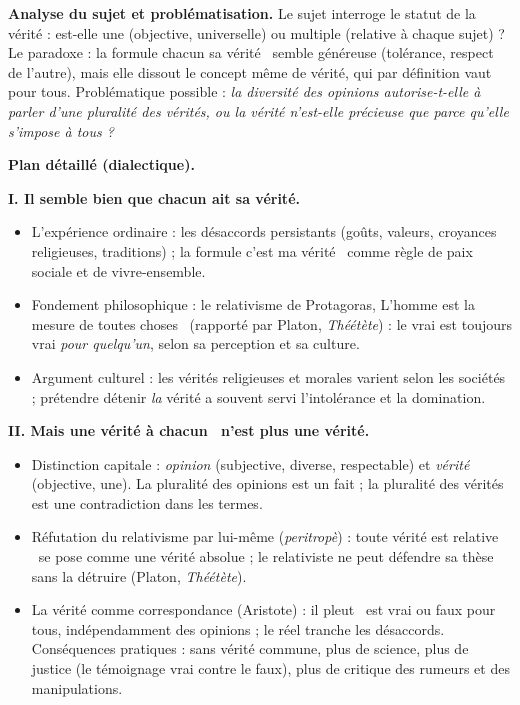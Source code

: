 \documentclass[11pt]{article}
\begin{document}
\begin{corrige}
\textbf{Analyse du sujet et problématisation.} Le sujet interroge le statut de la vérité : est-elle une (objective, universelle) ou multiple (relative à chaque sujet) ? Le paradoxe : la formule \guillemotleft chacun sa vérité \guillemotright\ semble généreuse (tolérance, respect de l'autre), mais elle dissout le concept même de vérité, qui par définition vaut pour tous. Problématique possible : \emph{la diversité des opinions autorise-t-elle à parler d'une pluralité des vérités, ou la vérité n'est-elle précieuse que parce qu'elle s'impose à tous ?}

\textbf{Plan détaillé (dialectique).}

\textbf{I. Il semble bien que chacun ait sa vérité.}
\begin{itemize}
\item L'expérience ordinaire : les désaccords persistants (goûts, valeurs, croyances religieuses, traditions) ; la formule \guillemotleft c'est ma vérité \guillemotright\ comme règle de paix sociale et de vivre-ensemble.
\item Fondement philosophique : le relativisme de Protagoras, \guillemotleft L'homme est la mesure de toutes choses \guillemotright\ (rapporté par Platon, \emph{Théétète}) : le vrai est toujours vrai \emph{pour quelqu'un}, selon sa perception et sa culture.
\item Argument culturel : les vérités religieuses et morales varient selon les sociétés ; prétendre détenir \emph{la} vérité a souvent servi l'intolérance et la domination.
\end{itemize}

\textbf{II. Mais une vérité \guillemotleft à chacun \guillemotright\ n'est plus une vérité.}
\begin{itemize}
\item Distinction capitale : \emph{opinion} (subjective, diverse, respectable) et \emph{vérité} (objective, une). La pluralité des opinions est un fait ; la pluralité des vérités est une contradiction dans les termes.
\item Réfutation du relativisme par lui-même (\emph{peritropè}) : \guillemotleft toute vérité est relative \guillemotright\ se pose comme une vérité absolue ; le relativiste ne peut défendre sa thèse sans la détruire (Platon, \emph{Théétète}).
\item La vérité comme correspondance (Aristote) : \guillemotleft il pleut \guillemotright\ est vrai ou faux pour tous, indépendamment des opinions ; le réel tranche les désaccords. Conséquences pratiques : sans vérité commune, plus de science, plus de justice (le témoignage vrai contre le faux), plus de critique des rumeurs et des manipulations.
\end{itemize}


\end{corrige}
\end{document}
